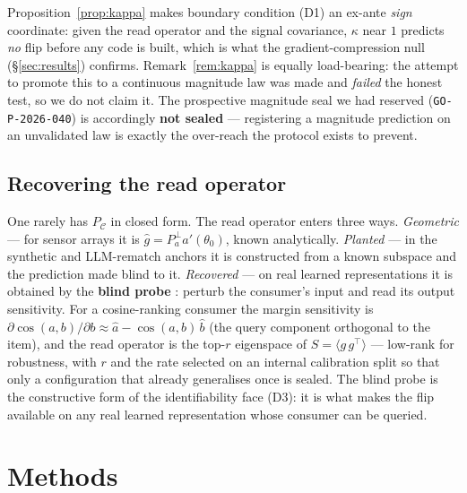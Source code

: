 \documentclass[11pt]{article}
\theoremstyle{remark}
\newcommand{\PC}{P_{\mathcal{C}}}
\newcommand{\kalign}{\kappa}
\newcommand{\seal}[1]{\texttt{GO-P-2026-#1}}
\begin{document}
Proposition~\ref{prop:kappa} makes boundary condition (D1) an ex-ante \emph{sign}
coordinate: given the read operator and the signal covariance, $\kalign$ near $1$ predicts
\emph{no} flip before any code is built, which is what the gradient-compression null
(\S\ref{sec:results}) confirms. Remark~\ref{rem:kappa} is equally load-bearing: the
attempt to promote this to a continuous magnitude law was made and \emph{failed} the
honest test, so we do not claim it. The prospective magnitude seal we had reserved
(\seal{040}) is accordingly \textbf{not sealed} --- registering a magnitude prediction on
an unvalidated law is exactly the over-reach the protocol exists to prevent.

\subsection{Recovering the read operator}\label{sec:probe}

One rarely has $\PC$ in closed form. The read operator enters three ways.
\emph{Geometric} --- for sensor arrays it is $\hat g=P_a^{\perp}a'(\theta_0)$, known
analytically. \emph{Planted} --- in the synthetic and LLM-rematch anchors it is
constructed from a known subspace and the prediction made blind to it. \emph{Recovered}
--- on real learned representations it is obtained by the \textbf{blind probe}
\citep{cost}: perturb the consumer's input and read its output sensitivity. For a
cosine-ranking consumer the
margin sensitivity is $\partial\cos(a,b)/\partial b \approx \hat a-\cos(a,b)\,\hat b$
(the query component orthogonal to the item), and the read operator is the top-$r$
eigenspace of $S=\langle g\,g^\top\rangle$ --- low-rank for robustness, with $r$ and the
rate selected on an internal calibration split so that only a configuration that already
generalises once is sealed. The blind probe is the constructive form of the
identifiability face (D3): it is what makes the flip available on any real learned
representation whose consumer can be queried.

\section{Methods}\label{sec:methods}
\end{document}
